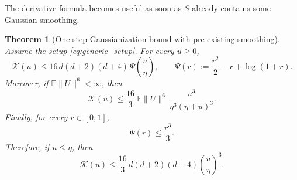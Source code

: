 \documentclass[11pt]{article}
\def\E{\mathbb{E}}
\newcommand{\norm}[1]{\|#1\|}
\newcommand{\PsiFn}{\Psi}
\newtheorem{thm}{Theorem}
\begin{document}
The derivative formula becomes useful as soon as \(S\) already contains some Gaussian smoothing.

\begin{thm}[One-step Gaussianization bound with pre-existing smoothing]
\label{thm:generic_one_step_bound}
Assume the setup \eqref{eq:generic_setup}. For every \(u\ge 0\),
\begin{equation}
\label{eq:generic_one_step_bound}
\mathcal K(u)
\le
16\,d(d+2)(d+4)\,\PsiFn\!\left(\frac{u}{\eta}\right),
\qquad
\PsiFn(r):=\frac{r^2}{2}-r+\log(1+r).
\end{equation}
Moreover, if \(\E\norm{U}^6<\infty\), then
\begin{equation}
\label{eq:generic_one_step_refined}
\mathcal K(u)
\le
\frac{16}{3}\,\E\norm{U}^6\,\frac{u^3}{\eta^3(\eta+u)^3}.
\end{equation}
Finally, for every \(r\in[0,1]\),
\begin{equation}
\label{eq:Psi_cubic_bound}
\PsiFn(r)\le \frac{r^3}{3}.
\end{equation}
Therefore, if \(u\le \eta\), then
\begin{equation}
\label{eq:generic_one_step_cubic}
\mathcal K(u)
\le
\frac{16}{3}\,d(d+2)(d+4)\left(\frac{u}{\eta}\right)^3.
\end{equation}
\end{thm}
\end{document}
